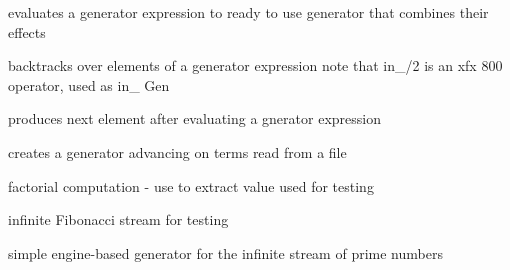 \documentclass[11pt]{article}
\begin{document}
\begin{description}
evaluates a generator expression to ready to use
generator that combines their effects

backtracks over elements of a generator expression
note that in_/2 is an xfx 800 operator, used as  in_ Gen

produces next element after evaluating a gnerator expression

creates a generator advancing on terms read from a file

factorial computation - use  to extract value
used for testing

infinite Fibonacci stream for testing

simple engine-based generator for the infinite stream of prime numbers
\end{description}


\printindex
\end{document}
